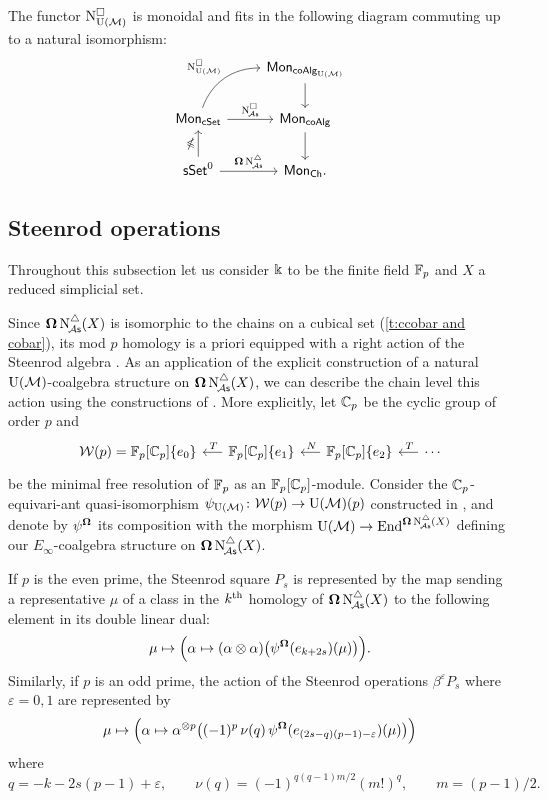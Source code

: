 \begin{lemma}\label{l:lift of cobar to e-infty}
	The functor $\operatorname{N^{\square}_{{\operatorname{U}(\mathcal{M})}}}$ is monoidal and fits in the following diagram commuting up to a natural isomorphism:
	\[
	\begin{tikzcd}
		& \Mon_{\coAlg_\UM} \arrow[d] \\
		\Mon_{\cSet} \arrow[ru, "\cchainsUM", out=70, in=180] \arrow[r, "\cchainsA"]
		& \Mon_{\coAlg} \arrow[d] \\
		\sSet^0 \arrow[r, "\cobar \schainsA"] \arrow[u, "\ccobar"]
		& \Mon_{\Ch}.
	\end{tikzcd}
	\]
\end{lemma}

\subsection{Steenrod operations}

Throughout this subsection let us consider $\Bbbk$ to be the finite field ${\mathbb{F}_p}$ and $X$ a reduced simplicial set.

Since $\operatorname{\mathbf{\Omega}} \operatorname{N^{\triangle}_{\!{\mathcal{A}\mathsf{s}}}}(X)$ is isomorphic to the chains on a cubical set (\cref{t:ccobar and cobar}), its mod $p$ homology is a priori equipped with a right action of the Steenrod algebra \cite{steenrod1962cohomology, milnor1958steenrod}.
As an application of the explicit construction of a natural ${\operatorname{U}(\mathcal{M})}$-coalgebra structure on $\operatorname{\mathbf{\Omega}} \operatorname{N^{\triangle}_{\!{\mathcal{A}\mathsf{s}}}}(X)$, we can describe the chain level this action using the constructions of \cite{medina2021may_st}.
More explicitly, let ${\mathbb{C}_p}$ be the cyclic group of order $p$ and
\[
\begin{tikzcd} [column sep = .5cm]
	\cW(p) = \Fp[\Cp]\{e_0\} & \arrow[l, "\,T"'] \Fp[\Cp]\{e_1\} & \arrow[l, "\,N"'] \Fp[\Cp]\{e_2\} & \arrow[l, "\,T"'] \dotsb
\end{tikzcd}
\]
be the minimal free resolution of ${\mathbb{F}_p}$ as an ${\mathbb{F}_p}[{\mathbb{C}_p}]$-module.
Consider the ${\mathbb{C}_p}$-equivari-ant quasi-isomorphism $\psi_{\operatorname{U}(\mathcal{M})} \colon \mathcal{W}(p) \to {\operatorname{U}(\mathcal{M})}(p)$ constructed in \cite{medina2021may_st}, and denote by $\psi^{\operatorname{\mathbf{\Omega}}}$ its composition with the morphism ${\operatorname{U}(\mathcal{M})} \to \mathrm{End}^{\operatorname{\mathbf{\Omega}} \operatorname{N^{\triangle}_{\!{\mathcal{A}\mathsf{s}}}}(X)}$ defining our $E_\infty$-coalgebra structure on $\operatorname{\mathbf{\Omega}} \operatorname{N^{\triangle}_{\!{\mathcal{A}\mathsf{s}}}}(X)$.

If $p$ is the even prime, the Steenrod square $P_s$ is represented by the map sending a representative $\mu$ of a class in the $k^{\mathrm{th}}$ homology of $\operatorname{\mathbf{\Omega}} \operatorname{N^{\triangle}_{\!{\mathcal{A}\mathsf{s}}}}(X)$ to the following element in its double linear dual:
\[
\mu \mapsto
\Big( \alpha \mapsto (\alpha \otimes \alpha) \big( \psi^{\operatorname{\mathbf{\Omega}}}(e_{k+2s})(\mu) \big) \Big).
\]
Similarly, if $p$ is an odd prime, the action of the Steenrod operations $\beta^\varepsilon P_{s}$ where $\varepsilon = 0,1$ are represented by
\[
\mu \mapsto
\Big( \alpha \mapsto \alpha^{\otimes p} \big( (-1)^p \, \nu(q) \, \psi^{\operatorname{\mathbf{\Omega}}}(e_{(2s-q)(p-1)-\varepsilon})(\mu) \big) \Big)
\]
where
\[
q = -k -2s(p-1) + \varepsilon, \qquad
\nu(q) = (-1)^{q(q-1)m/2}(m!)^q, \qquad
m = (p-1)/2.
\]

